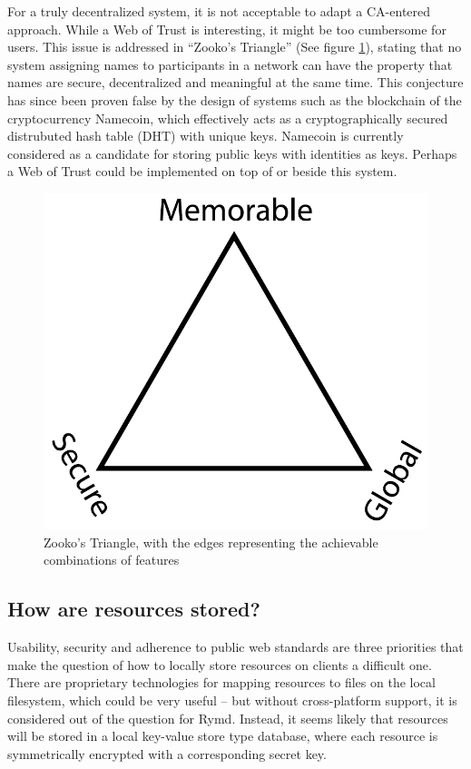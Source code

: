 For a truly decentralized system, it is not acceptable to adapt a CA-entered approach. While a Web of Trust is interesting, it might be too cumbersome for users. This issue is addressed in “Zooko’s Triangle” (See figure \ref{fig:zooko}), stating that no system assigning names to participants in a network can have the property that names are secure, decentralized and meaningful at the same time. This conjecture has since been proven false by the design of systems such as the blockchain of the cryptocurrency Namecoin, which effectively acts as a cryptographically secured distrubuted hash table (DHT) with unique keys. Namecoin is currently considered as a candidate for storing public keys with identities as keys. Perhaps a Web of Trust could be implemented on top of or beside this system.
\begin{figure}[h]
\centering
\includegraphics[width=\textwidth,height=0.2\paperheight,keepaspectratio
]{figures/Zooko_s_Triangle}
\caption{Zooko's Triangle, with the edges representing the achievable combinations of features \cite{Zooko:2001:Online}}
\label{fig:zooko}
\end{figure}

\subsection {How are resources stored?}
Usability, security and adherence to public web standards are three priorities that make the question of how to locally store resources on clients a difficult one. There are proprietary technologies for mapping resources to files on the local filesystem, which could be very useful – but without cross-platform support, it is considered out of the question for Rymd. Instead, it seems likely that resources will be stored in a local key-value store type database, where each resource is symmetrically encrypted with a corresponding secret key.

